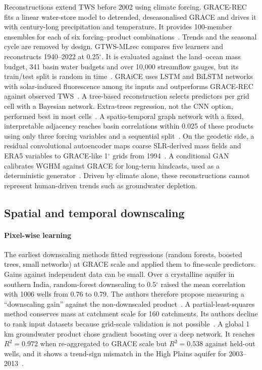 Reconstructions extend TWS before 2002 using climate forcing. GRACE-REC fits a linear water-store model to detrended, deseasonalised GRACE and drives it with century-long precipitation and temperature. It provides 100-member ensembles for each of six forcing--product combinations~\cite{humphrey2019gracerec}. Trends and the seasonal cycle are removed by design. GTWS-MLrec compares five learners and reconstructs 1940--2022 at 0.25$^\circ$. It is evaluated against the land--ocean mass budget, 341 basin water budgets and over 10{,}000 streamflow gauges, but its train/test split is random in time~\cite{yin2023gtwsmlrec}. GRAiCE uses LSTM and BiLSTM networks with solar-induced fluorescence among its inputs and outperforms GRACE-REC against observed TWS~\cite{palazzoli2025graice}. A tree-based reconstruction selects predictors per grid cell with a Bayesian network. Extra-trees regression, not the CNN option, performed best in most cells~\cite{mandal2025reconstruction}. A spatio-temporal graph network with a fixed, interpretable adjacency reaches basin correlations within 0.025 of these products using only three forcing variables and a sequential split~\cite{arzoumanidis2026stgnn}. On the geodetic side, a residual convolutional autoencoder maps coarse SLR-derived mass fields and ERA5 variables to GRACE-like 1$^\circ$ grids from 1994~\cite{uz2024highres}. A conditional GAN calibrates WGHM against GRACE for long-term hindcasts, used as a deterministic generator~\cite{wang2024recgan}. Driven by climate alone, these reconstructions cannot represent human-driven trends such as groundwater depletion.

\subsection{Spatial and temporal downscaling}

\paragraph{Pixel-wise learning} The earliest downscaling methods fitted regressions (random forests, boosted trees, small networks) at GRACE scale and applied them to fine-scale predictors. Gains against independent data can be small. Over a crystalline aquifer in southern India, random-forest downscaling to 0.5$^\circ$ raised the mean correlation with 1006 wells from 0.76 to 0.79. The authors therefore propose measuring a ``downscaling gain'' against the non-downscaled product~\cite{pascal2022evaluating}. A partial-least-squares method conserves mass at catchment scale for 160 catchments. Its authors decline to rank input datasets because grid-scale validation is not possible~\cite{vishwakarma2021plsr}. A global 1\,km groundwater product chose gradient boosting over a deep network. It reaches $R^2 = 0.972$ when re-aggregated to GRACE scale but $R^2 = 0.538$ against held-out wells, and it shows a trend-sign mismatch in the High Plains aquifer for 2003--2013~\cite{zhang2026groundwater}.

